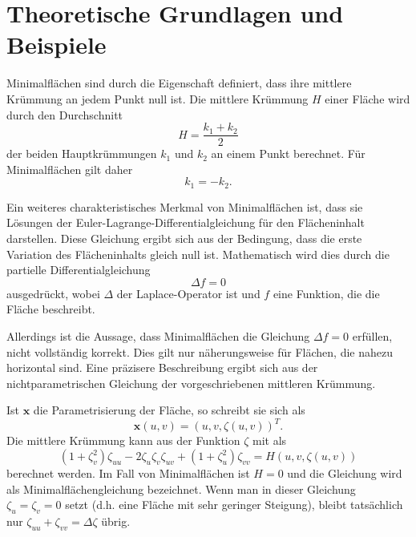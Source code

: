 %
%
%
%
\section{Theoretische Grundlagen und Beispiele
	\label{minimalflaechen:section:Theoretische Grundlagen und Beispiele}}
Minimalflächen sind durch die Eigenschaft definiert, dass ihre
mittlere Krümmung an jedem Punkt null ist.
Die mittlere Krümmung $H$ einer Fläche wird durch den Durchschnitt
%
%
%
\begin{equation}
	H=\frac{k_{1}+k_{2}}{2}
\end{equation}
%
der beiden Hauptkrümmungen $k_1$ und $k_2$ an einem Punkt berechnet.
Für Minimalflächen gilt daher
%
\begin{equation}
	k_{1}=-k_{2}.
\end{equation}

Ein weiteres charakteristisches Merkmal von Minimalflächen ist, dass sie Lösungen der Euler-Lagrange-Differentialgleichung für den Flächeninhalt darstellen.
Diese Gleichung ergibt sich aus der Bedingung, dass die erste Variation des Flächeninhalts gleich null ist.
Mathematisch wird dies durch die partielle Differentialgleichung
%
\begin{equation}
	\Delta f = 0
\end{equation}
%
ausgedrückt, wobei $\Delta$ der Laplace-Operator ist und $f$ eine Funktion, die die Fläche beschreibt.

Allerdings ist die Aussage, dass Minimalflächen die Gleichung \(\Delta f = 0\) erfüllen, nicht vollständig korrekt.
Dies gilt nur näherungsweise für Flächen, die nahezu horizontal sind.
Eine präzisere Beschreibung ergibt sich aus der nichtparametrischen Gleichung der vorgeschriebenen mittleren Krümmung.

Ist \(\mathbf{x}\) die Parametrisierung der Fläche, so schreibt sie sich als
\begin{equation}
\mathbf{x}(u,v) = (u,v,\zeta(u,v))^{T}.
\end{equation}
Die mittlere Krümmung kann aus
der Funktion \(\zeta\) mit als
\begin{equation}
(1 + \zeta_{v}^{2})\zeta_{uu} - 2\zeta_{u}\zeta_{v}\zeta_{uv} + (1 + \zeta_{u}^{2})\zeta_{vv} = H(u,v,\zeta(u,v))
\end{equation}
berechnet werden.
%
Im Fall von Minimalflächen ist \(H = 0\) und die Gleichung wird als Minimalflächengleichung bezeichnet.
%
Wenn man in dieser Gleichung \(\zeta_u = \zeta_v = 0\) setzt (d.h. eine Fläche mit sehr geringer Steigung), bleibt tatsächlich nur \(\zeta_{uu} + \zeta_{vv} = \Delta \zeta\) übrig. 







